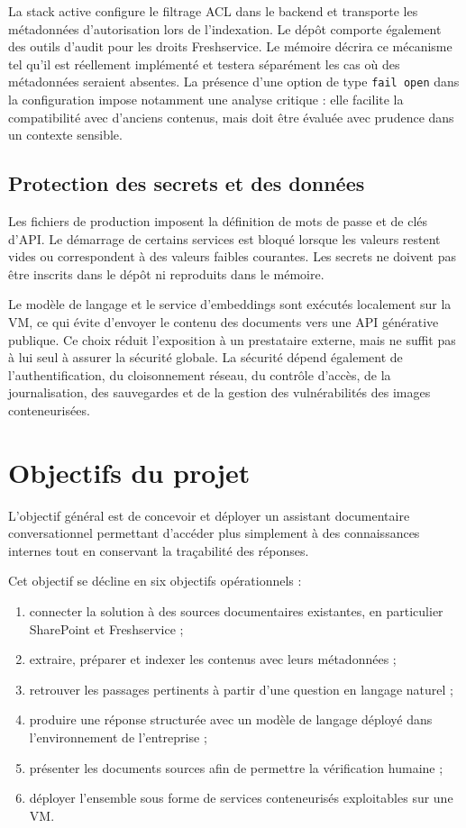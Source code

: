 La stack active configure le filtrage ACL dans le backend et transporte les métadonnées d'autorisation lors de l'indexation. Le dépôt comporte également des outils d'audit pour les droits Freshservice. Le mémoire décrira ce mécanisme tel qu'il est réellement implémenté et testera séparément les cas où des métadonnées seraient absentes. La présence d'une option de type \texttt{fail open} dans la configuration impose notamment une analyse critique : elle facilite la compatibilité avec d'anciens contenus, mais doit être évaluée avec prudence dans un contexte sensible.

\subsection{Protection des secrets et des données}

Les fichiers de production imposent la définition de mots de passe et de clés d'API. Le démarrage de certains services est bloqué lorsque les valeurs restent vides ou correspondent à des valeurs faibles courantes. Les secrets ne doivent pas être inscrits dans le dépôt ni reproduits dans le mémoire.

Le modèle de langage et le service d'embeddings sont exécutés localement sur la VM, ce qui évite d'envoyer le contenu des documents vers une API générative publique. Ce choix réduit l'exposition à un prestataire externe, mais ne suffit pas à lui seul à assurer la sécurité globale. La sécurité dépend également de l'authentification, du cloisonnement réseau, du contrôle d'accès, de la journalisation, des sauvegardes et de la gestion des vulnérabilités des images conteneurisées.

\section{Objectifs du projet}

L'objectif général est de concevoir et déployer un assistant documentaire conversationnel permettant d'accéder plus simplement à des connaissances internes tout en conservant la traçabilité des réponses.

Cet objectif se décline en six objectifs opérationnels :

\begin{enumerate}
    \item connecter la solution à des sources documentaires existantes, en particulier SharePoint et Freshservice ;
    \item extraire, préparer et indexer les contenus avec leurs métadonnées ;
    \item retrouver les passages pertinents à partir d'une question en langage naturel ;
    \item produire une réponse structurée avec un modèle de langage déployé dans l'environnement de l'entreprise ;
    \item présenter les documents sources afin de permettre la vérification humaine ;
    \item déployer l'ensemble sous forme de services conteneurisés exploitables sur une VM.
\end{enumerate}


